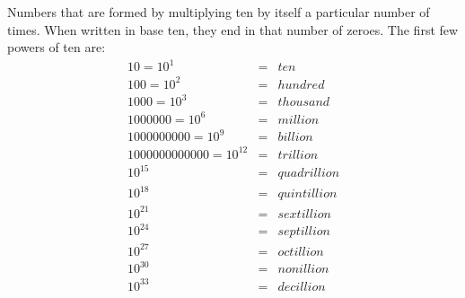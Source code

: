Numbers that are formed by multiplying ten by itself a particular
number of times.  When written in base ten, they end in that number of
zeroes.
The first few powers of ten are:
\begin{eqnarray*}
  10 = 10^{1} & = & ten \\
  100 =  10^{2} & = & hundred \\
  1000 = 10^{3} & = & thousand \\
  1000000 = 10^{6} & = & million \\
  1000000000 = 10^{9} & = & billion \\
  1000000000000 = 10^{12} & = & trillion \\
  10^{15} & = & quadrillion \\
  10^{18} & = & quintillion \\
  10^{21} & = & sextillion \\
  10^{24} & = & septillion \\
  10^{27} & = & octillion \\
  10^{30} & = & nonillion \\
  10^{33} & = & decillion 
\end{eqnarray*}